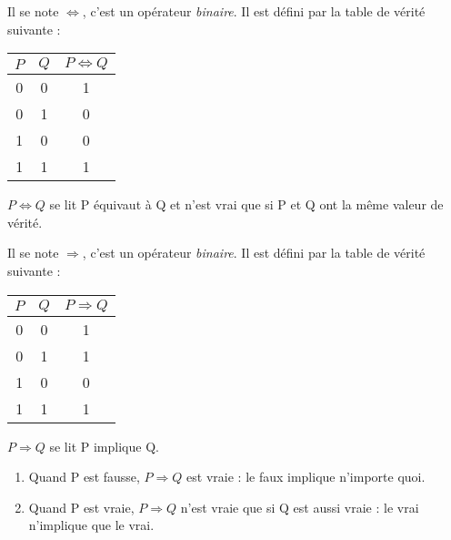 \documentclass[a4paper,12pt,french]{book}
\begin{document}
\begin{definition}
	Il se note $\Leftrightarrow$, c'est un opérateur \textit{binaire}.
	Il est défini par la table de vérité suivante : 
	\begin{center}
		\begin{tabular}{|c|c|c|}
			\hline
			\rowcolor{lightgray}
			$P$ & $Q$ & $P\Leftrightarrow Q$\\ 
			\hline 
			\rowcolor{white}
			0 & 0 & 1\\ 
			\hline
			\rowcolor{white}
			0 & 1 & 0\\ 
			\hline
			\rowcolor{white}
			1 & 0 & 0\\ 
			\hline\rowcolor{white}
			1 & 1 & 1\\ 
			\hline
		\end{tabular} 
	\end{center}
	$P\Leftrightarrow Q$ se lit \og P équivaut à Q\fg{} et n'est vrai que si P et Q ont la même valeur de vérité.
\end{definition}	


\begin{definition}[ : implication]
	Il se note $\Rightarrow$, c'est un opérateur \textit{binaire}.
	Il est défini par la table de vérité suivante : 
	\begin{center}
		\begin{tabular}{|c|c|c|}
			\hline
			\rowcolor{lightgray}
			$P$ & $Q$ & $P\Rightarrow Q$\\ 
			\hline 
			\rowcolor{white}
			0 & 0 & 1\\ 
			\hline
			\rowcolor{white}
			0 & 1 & 1\\ 
			\hline
			\rowcolor{white}
			1 & 0 & 0\\ 
			\hline\rowcolor{white}
			1 & 1 & 1\\ 
			\hline
		\end{tabular} 
	\end{center}
	$P\Rightarrow Q$ se lit \og P implique Q\fg{}.
	\begin{enumerate}[\textbullet]
		\item 	Quand P est fausse, $P\Rightarrow Q$ est vraie : \og le faux implique n'importe quoi\fg{}.
		\item 	Quand P est vraie, $P\Rightarrow Q$ n'est vraie que si Q est aussi vraie : \og le vrai n'implique que le vrai\fg{}.	
	\end{enumerate}
\end{definition}
\end{document}
